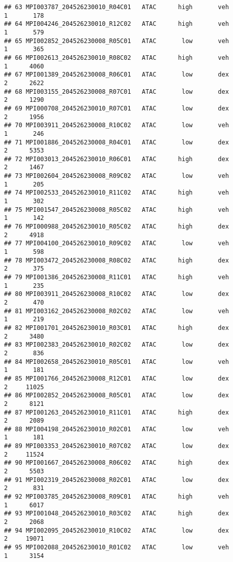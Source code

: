 \documentclass[
]{article}
\begin{document}
\begin{verbatim}
## 63 MPI003787_204526230010_R04C01   ATAC      high       veh         1       178
## 64 MPI004246_204526230010_R12C02   ATAC      high       veh         1       579
## 65 MPI002852_204526230008_R05C01   ATAC       low       veh         1       365
## 66 MPI002613_204526230010_R08C02   ATAC      high       veh         1      4060
## 67 MPI001389_204526230008_R06C01   ATAC       low       dex         2      2622
## 68 MPI003155_204526230008_R07C01   ATAC       low       dex         2      1290
## 69 MPI000708_204526230010_R07C01   ATAC       low       dex         2      1956
## 70 MPI003911_204526230008_R10C02   ATAC       low       veh         1       246
## 71 MPI001886_204526230008_R04C01   ATAC       low       dex         2      5353
## 72 MPI003013_204526230010_R06C01   ATAC      high       dex         2      1467
## 73 MPI002604_204526230008_R09C02   ATAC       low       veh         1       205
## 74 MPI002533_204526230010_R11C02   ATAC      high       veh         1       302
## 75 MPI001547_204526230008_R05C02   ATAC      high       veh         1       142
## 76 MPI000988_204526230010_R05C02   ATAC      high       dex         2      4918
## 77 MPI004100_204526230010_R09C02   ATAC       low       veh         1       598
## 78 MPI003472_204526230008_R08C02   ATAC      high       dex         2       375
## 79 MPI001386_204526230008_R11C01   ATAC      high       veh         1       235
## 80 MPI003911_204526230008_R10C02   ATAC       low       dex         2       470
## 81 MPI003162_204526230008_R02C02   ATAC       low       veh         1       219
## 82 MPI001701_204526230010_R03C01   ATAC      high       dex         2      3480
## 83 MPI002383_204526230010_R02C02   ATAC       low       dex         2       836
## 84 MPI002658_204526230010_R05C01   ATAC       low       veh         1       181
## 85 MPI001766_204526230008_R12C01   ATAC       low       dex         2     11025
## 86 MPI002852_204526230008_R05C01   ATAC       low       dex         2      8121
## 87 MPI001263_204526230010_R11C01   ATAC      high       dex         2      2089
## 88 MPI004198_204526230010_R02C01   ATAC       low       veh         1       181
## 89 MPI003353_204526230010_R07C02   ATAC       low       dex         2     11524
## 90 MPI001667_204526230008_R06C02   ATAC      high       dex         2      5503
## 91 MPI002319_204526230008_R02C01   ATAC       low       dex         2       831
## 92 MPI003785_204526230008_R09C01   ATAC      high       veh         1      6017
## 93 MPI001048_204526230010_R03C02   ATAC      high       dex         2      2068
## 94 MPI002095_204526230010_R10C02   ATAC       low       dex         2     19071
## 95 MPI002088_204526230010_R01C02   ATAC       low       veh         1      3154
\end{verbatim}
\end{document}
